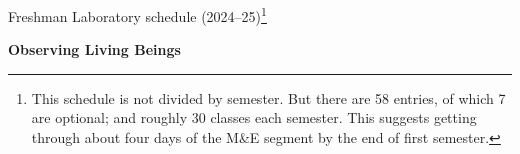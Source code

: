 \documentclass{article}
\begin{document}
\thispagestyle{empty}
\pagestyle{fancy}
\fancyhead{}
\noindent Freshman Laboratory schedule (2024--25)\footnote{This schedule is not divided by semester. But there are 58 entries, of which 7 are optional; and roughly 30 classes each semester. This suggests getting through about four days of the M\&E segment by the end of first semester.}


\smallskip

\begin{center}
\textbf{Observing Living Beings}
\end{center}
\end{document}
